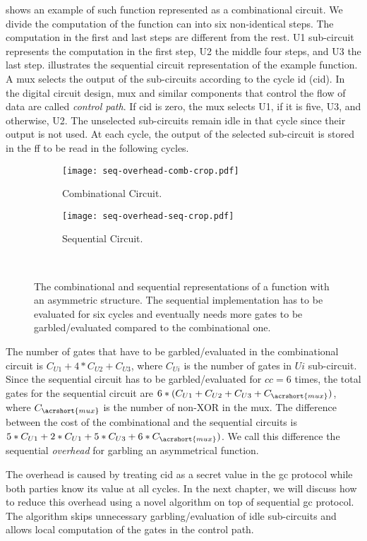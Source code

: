  shows an example of such function represented as a combinational circuit.
We divide the computation of the function can into six non-identical steps.
The computation in the first and last steps are different from the rest.
U1 sub-circuit represents the computation in the first step, U2 the middle four steps, and U3 the last step.
 illustrates the sequential circuit representation of the example function.
A \acrshort{mux} selects the output of the sub-circuits according to the cycle id (cid).
In the digital circuit design, \acrshort{mux} and similar components that control the flow of data are called \textit{control path}.
If cid is zero, the \acrshort{mux} selects U1, if it is five, U3, and otherwise, U2.
The unselected sub-circuits remain idle in that cycle since their output is not used.
At each cycle, the output of the selected sub-circuit is stored in the \acrshort{ff} to be read in the following cycles.

\begin{figure}
    \centering
    \begin{subfigure}[t]{0.7\textwidth}
        \texttt{[image: seq-overhead-comb-crop.pdf]}
        \caption{Combinational Circuit.}\label{fig:seq-overhead-comb}
    \end{subfigure}
    \begin{subfigure}[t]{0.6\textwidth}
        \texttt{[image: seq-overhead-seq-crop.pdf]}
        \caption{Sequential Circuit.}\label{fig:seq-overhead-seq}
    \end{subfigure}\\
    \caption{The combinational and sequential representations of a function with an asymmetric structure.
    The sequential implementation has to be evaluated for six cycles and eventually needs more gates to be garbled/evaluated compared to the combinational one.}\label{fig:fig:seq-overhead-comb}
\end{figure}

The number of gates that have to be garbled/evaluated in the combinational circuit is $C_{U1}+4*C_{U2}+C_{U3}$, where $C_{Ui}$ is the number of gates in $Ui$ sub-circuit.
Since the sequential circuit has to be garbled/evaluated for $cc=6$ times, the total gates for the sequential circuit are $6*(C_{U1}+C_{U2}+C_{U3}+C_{\acrshort{mux}})$, where $C_{\acrshort{mux}}$ is the number of non-XOR in the \acrshort{mux}.
The difference between the cost of the combinational and the sequential circuits is $5*C_{U1}+2*C_{U1}+5*C_{U3}+6*C_{\acrshort{mux}})$.
We call this difference the sequential \textit{overhead} for garbling an asymmetrical function.

The overhead is caused by treating cid as a secret value in the \acrshort{gc} protocol while both parties know its value at all cycles.
In the next chapter, we will discuss how to reduce this overhead using a novel algorithm on top of sequential \acrshort{gc} protocol.
The algorithm skips unnecessary garbling/evaluation of idle sub-circuits and allows local computation of the gates in the control path.
